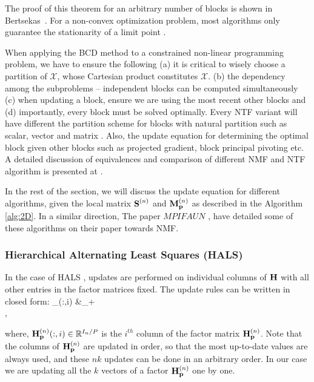 The proof of this theorem for an arbitrary number of blocks is shown
in Bertsekas~\cite{Bertsekas1999}.
For a non-convex optimization problem, most algorithms only guarantee
the stationarity of a limit point \cite{Lin2007}.

When applying the BCD method to a constrained non-linear programming
problem, we have to ensure the following (a) it is critical to wisely choose a partition of
$\mathcal{X}$, whose Cartesian product constitutes $\mathcal{X}$. 
(b)  the dependency among the subproblems -- independent blocks can be 
computed simultaneously  (c) when updating a block, ensure we are 
using the most recent other blocks and (d) importantly, every block
must be solved optimally. Every NTF variant will have different the partition
scheme for blocks with natural partition such as scalar, vector \cite{CP2009} and matrix \cite{KP2011}. 
Also, the update equation for determining the optimal block given
other blocks such as projected gradient, block principal pivoting \cite{KP2011}  etc. 
A detailed discussion of equivalences and comparison of different NMF and NTF algorithm
is presented at \cite{KHP2014}. 

In the rest of the section, we will discuss the update equation for different 
algorithms, given the local matrix $\Mn{S}{n}$ and $\Mn{M}{n}_{\V{p}}$ as described in the
Algorithm \ref{alg:2D}. In a similar direction, The paper $MPIFAUN$ \cite{KBP2018}, have detailed some of 
these algorithms on their paper towards NMF.

\subsubsection{Hierarchical Alternating Least Squares (HALS)}
\label{sec:HALS}

In the case of HALS \cite{CP2009}, updates are performed on individual columns of $\mathbf{H}$ with all other entries in the factor matrices fixed.
The update rules \cite[Algorithm 2]{CP2009} can be written in closed form:
\SplitN{\label{eqn:halsupdate}} {
_{}(:,i) &\leftarrow \lt[ \Mn{H}{n}_{\V{p}}(:,i) + \Mn{M}{n}_{\V{p}}(:,i) - (\Mn{H}{n}_{\V{p}} \Mn{S}{n})(:,i)  \rt]_+\\
}, 

where, $\Mn{H}{n}_{\V{p}}(:,i) \in \Rn{I_n/P}$ is the $i^{th}$ column of the factor matrix $\Mn{H}{n}_{\V{p}}$.
Note that the columns of $\Mn{H}{n}_{\V{p}}$ are updated in order, so that the most up-to-date values are always used, and these $nk$ updates can be done in an arbitrary order.  In our case we are updating all the $k$ vectors of a factor $\Mn{H}{n}_{\V{p}}$ one by one. 

